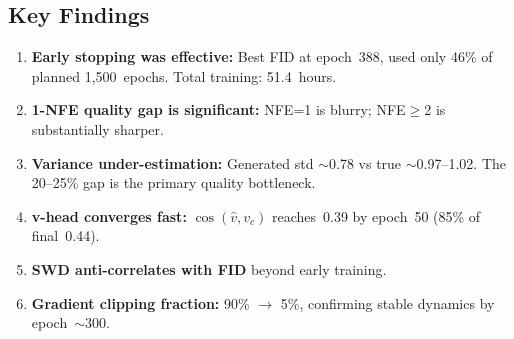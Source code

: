 \subsection{Key Findings}

\begin{enumerate}[nosep]
  \item \textbf{Early stopping was effective:} Best FID at epoch~388,
    used only 46\% of planned 1,500~epochs. Total training: 51.4~hours.
  \item \textbf{1-NFE quality gap is significant:} NFE=1 is blurry;
    NFE$\geq$2 is substantially sharper.
  \item \textbf{Variance under-estimation:} Generated std ${\sim}$0.78 vs
    true ${\sim}$0.97--1.02.  The 20--25\% gap is the primary quality
    bottleneck.
  \item \textbf{v-head converges fast:} $\cos(\hat{v},v_c)$ reaches~0.39 by
    epoch~50 (85\% of final~0.44).
  \item \textbf{SWD anti-correlates with FID} beyond early training.
  \item \textbf{Gradient clipping fraction:} 90\% $\to$ 5\%, confirming stable
    dynamics by epoch~${\sim}300$.
\end{enumerate}
